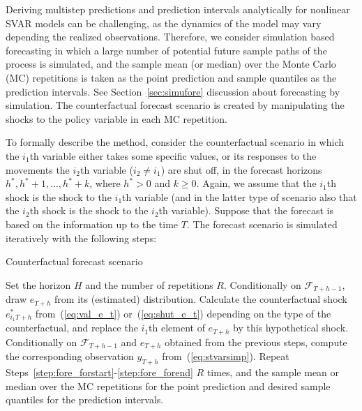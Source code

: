 \documentclass[nojss]{jss}
\begin{document}
Deriving multistep predictions and prediction intervals analytically for nonlinear SVAR models can be challenging, as the dynamics of the model may vary depending the realized observations. Therefore, we consider simulation based forecasting in which a large number of potential future sample paths of the process is simulated, and the sample mean (or median) over the Monte Carlo (MC) repetitions is taken as the point prediction and sample quantiles as the prediction intervals. See Section~\ref{sec:simufore} discussion about forecasting by simulation. The counterfactual forecast scenario is created by manipulating the shocks to the policy variable in each MC repetition.

To formally describe the method, consider the counterfactual scenario in which the $i_1$th variable either takes some specific values, or its responses to the movements the $i_2$th variable ($i_2\neq i_1$) are shut off, in the forecast horizons $h^*, h^*+1,...,h^*+k$, where $h^*>0$ and $k\geq 0$. Again, we assume that the $i_1$th shock is the shock to the $i_1$th variable (and in the latter type of scenario also that the $i_2$th shock is the shock to the $i_2$th variable). Suppose that the forecast is based on the information up to the time $T$. The forecast scenario is simulated iteratively with the following steps:

\begin{algorithm}[!ht]
\caption{Counterfactual forecast scenario}
\begin{algorithmic}[1]\label{algo:forescen}
  \STATE Set the horizon $H$ and the number of repetitions $R$.
  \label{step:fore_forstart}
    \STATE Conditionally on $\mathcal{F}_{T+h-1}$, draw $e_{T+h}$ from its (estimated) distribution.
    \label{step:fore_forifstart}
      \STATE Calculate the counterfactual shock $e_{i_1T+h}^*$ from~(\ref{eq:val_e_t}) or~(\ref{eq:shut_e_t}) depending on the type of the counterfactual, and replace the $i_1$th element of $e_{T+h}$ by this hypothetical shock.\label{step:fore_count_shock}
    \ENDIF\label{step:fore_forifend}
  \STATE Conditionally on $\mathcal{F}_{T+h-1}$ and $e_{T+h}$ obtained from the previous steps, compute the corresponding observation $y_{T+h}$ from~(\ref{eq:stvarsimp}).
  \ENDFOR\label{step:fore_forend}
  \STATE Repeat Steps~\ref{step:fore_forstart}-\ref{step:fore_forend} $R$ times, and the sample mean or median over the MC repetitions for the point prediction and desired sample quantiles for the prediction intervals.
\end{algorithmic}
\end{algorithm}
\end{document}
